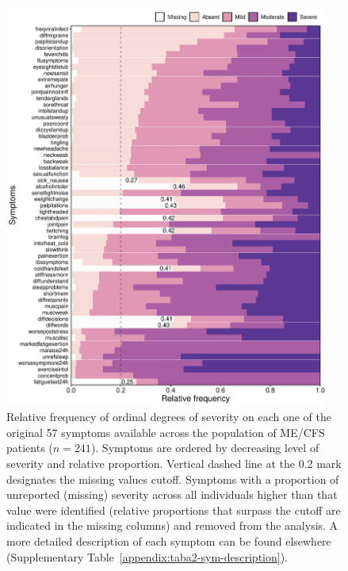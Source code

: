 \begin{figure}[htbp]
    \includegraphics[width=0.95\textwidth]{chapter/2024-sym-domains/figures/figa1-ordinal-symptom-proportion-by-absent.pdf}
    \caption[Relative frequency of ordinal degrees of severity on each one of the original 57 symptoms available across the population of ME/CFS patients]{Relative frequency of ordinal degrees of severity on each one of the original 57 symptoms available across the population of ME/CFS patients ($n = 241$). Symptoms are ordered by decreasing level of severity and relative proportion. Vertical dashed line at the 0.2 mark designates the missing values cutoff. Symptoms with a proportion of unreported (missing) severity across all individuals higher than that value were identified (relative proportions that surpass the cutoff are indicated in the missing columns) and removed from the analysis. A more detailed description of each symptom can be found elsewhere (Supplementary Table~\ref{appendix:taba2-sym-description}).}
    \label{fig:figa1-ordinal-symptom-proportion-by-absent}
\end{figure}

